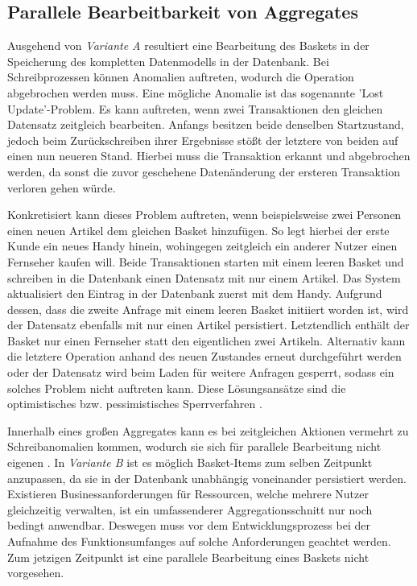 \subsection{Parallele Bearbeitbarkeit von Aggregates}

Ausgehend von \emph{Variante A} resultiert eine Bearbeitung des Baskets in der Speicherung des kompletten Datenmodells in der Datenbank. Bei Schreibprozessen können Anomalien auftreten, wodurch die Operation abgebrochen werden muss. Eine mögliche Anomalie ist das sogenannte 'Lost Update'-Problem. Es kann auftreten, wenn zwei Transaktionen den gleichen Datensatz zeitgleich bearbeiten. Anfangs besitzen beide denselben Startzustand, jedoch beim Zurückschreiben ihrer Ergebnisse stößt der letztere von beiden auf einen nun neueren Stand. Hierbei muss die Transaktion erkannt und abgebrochen werden, da sonst die zuvor geschehene Datenänderung der ersteren Transaktion verloren gehen würde.

Konkretisiert kann dieses Problem auftreten, wenn beispielsweise zwei Personen einen neuen Artikel dem gleichen Basket hinzufügen. So legt hierbei der erste Kunde ein neues Handy hinein, wohingegen zeitgleich ein anderer Nutzer einen Fernseher kaufen will. Beide Transaktionen starten mit einem leeren Basket und schreiben in die Datenbank einen Datensatz mit nur einem Artikel. Das System aktualisiert den Eintrag in der Datenbank zuerst mit dem Handy. Aufgrund dessen, dass die zweite Anfrage mit einem leeren Basket initiiert worden ist, wird der Datensatz ebenfalls mit nur einen Artikel persistiert. Letztendlich enthält der Basket nur einen Fernseher statt den eigentlichen zwei Artikeln. Alternativ kann die letztere Operation anhand des neuen Zustandes erneut durchgeführt werden oder der Datensatz wird beim Laden für weitere Anfragen gesperrt, sodass ein solches Problem nicht auftreten kann. Diese Lösungsansätze sind die optimistisches bzw. pessimistisches Sperrverfahren \cite[S. 385f.]{Vernon.2015}.

Innerhalb eines großen Aggregates kann es bei zeitgleichen Aktionen vermehrt zu Schreibanomalien kommen, wodurch sie sich für parallele Bearbeitung nicht eigenen \cite[S. 2]{Vernon.2011}. In \emph{Variante B} ist es möglich Basket-Items zum selben Zeitpunkt anzupassen, da sie in der Datenbank unabhängig voneinander persistiert werden. Existieren Businessanforderungen für Ressourcen, welche mehrere Nutzer gleichzeitig verwalten, ist ein umfassenderer Aggregationsschnitt nur noch bedingt anwendbar. Deswegen muss vor dem Entwicklungsprozess bei der Aufnahme des Funktionsumfanges auf solche Anforderungen geachtet werden. Zum jetzigen Zeitpunkt ist eine parallele Bearbeitung eines Baskets nicht vorgesehen.

